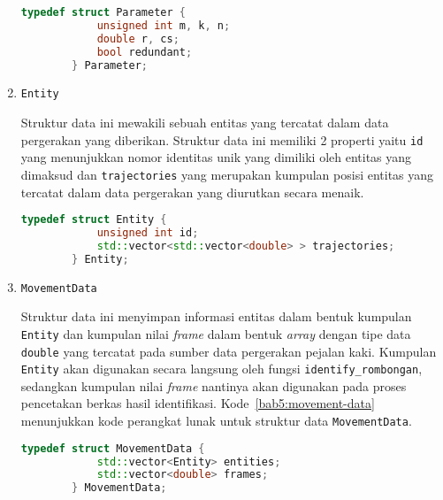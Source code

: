\begin{enumerate}
    \begin{lstlisting}[language=C++, caption=Implementasi \texttt{Parameters}, label={bab5:parameters}]
        typedef struct Parameter {
            unsigned int m, k, n;
            double r, cs;
            bool redundant;
        } Parameter;
    \end{lstlisting}
    
    \item \texttt{Entity}
    
    Struktur data ini mewakili sebuah entitas yang tercatat dalam data pergerakan yang diberikan. Struktur data ini memiliki 2 properti yaitu \texttt{id} yang menunjukkan nomor identitas unik yang dimiliki oleh entitas yang dimaksud dan \texttt{trajectories} yang merupakan kumpulan posisi entitas yang tercatat dalam data pergerakan yang diurutkan secara menaik.
    
    \iffalse
    
    Struktur data ini melakukan \textit{operator overloading} pada operator $<$. Hal tersebut dilakukan untuk mempermudah proses pengurutan entitas yang dilakukan pada fungsi \texttt{identify\_rombongan} dengan tujuan untuk mempermudah proses perbandingan kedekatan spasial antar entitas. Kode~\ref{bab5:entity} menunjukkan kode perangkat lunak untuk struktur data \texttt{Entity}.
    
    \fi
    
    \begin{lstlisting}[language=C++, caption=Implementasi \texttt{Entity}, label={bab5:entity}]
        typedef struct Entity {
            unsigned int id;
            std::vector<std::vector<double> > trajectories;
        } Entity;
    \end{lstlisting}
    
    \item \texttt{MovementData}
    
    Struktur data ini menyimpan informasi entitas dalam bentuk kumpulan \texttt{Entity} dan kumpulan nilai \textit{frame} dalam bentuk \textit{array} dengan tipe data \texttt{double} yang tercatat pada sumber data pergerakan pejalan kaki. Kumpulan \texttt{Entity} akan digunakan secara langsung oleh fungsi \texttt{identify\_rombongan}, sedangkan kumpulan nilai \textit{frame} nantinya akan digunakan pada proses pencetakan berkas hasil identifikasi. Kode~\ref{bab5:movement-data} menunjukkan kode perangkat lunak untuk struktur data \texttt{MovementData}.
    
    \begin{lstlisting}[language=C++, caption=Implementasi \texttt{MovementData}, label={bab5:movement-data}]
        typedef struct MovementData {
            std::vector<Entity> entities;
            std::vector<double> frames;
        } MovementData;
    \end{lstlisting}
    

\end{enumerate}
